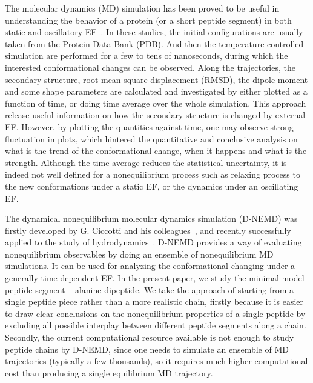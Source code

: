 \documentclass[a4paper,preprint,unsortedaddress,onecolumn]{revtex4-1}
\begin{document}
The molecular dynamics (MD) simulation has been proved to be useful in
understanding the behavior of a protein (or a short peptide segment)
in both static and oscillatory EF~\cite{budi2005electric, budi2007effect, budi2008comparative,
  toschi2008effects, astrakas2011electric, astrakas2012structural,
  damm2012can, starzyk2013proteins, english2009nonequilibrium,
  solomentsev2012effects}. In these studies, the initial
configurations are usually taken from the Protein Data Bank (PDB).
And then the temperature controlled simulation are performed for 
a few to tens of nanoseconds, during which the interested
conformational changes can be observed. Along the trajectories, the
secondary structure, root mean square displacement (RMSD), the dipole
moment and some shape parameters are calculated and investigated by
either plotted as a function of time, or doing time average over the
whole simulation. This approach release useful information on how the
secondary structure is changed by external  EF.  However,
by plotting the quantities against time, one may observe strong
fluctuation in plots, which hintered the quantitative and conclusive
analysis on what is the trend of the conformational change, when
it happens and what is the strength.
Although the time average reduces the statistical uncertainty,
it is indeed not well defined for a nonequilibrium process
such as relaxing process to the new conformations under a static
EF, or the dynamics under an oscillating EF.

The dynamical nonequilibrium molecular dynamics simulation (D-NEMD)
was firstly developed by G. Ciccotti and his
colleagues~\cite{ciccotti1975direct, ciccotti1979thought}, and
recently successfully applied to the study of
hydrodynamics~\cite{orlandini2011hydrodynamics,
  orlandini2011hydrodynamics-01}. D-NEMD provides a way of evaluating
nonequilibrium observables by doing an ensemble of nonequilibrium MD
simulations.  It can be used for analyzing the
conformational changing under a generally time-dependent EF.
In the present paper, we study the minimal model peptide
segment -- alanine dipeptide. We take the approach of starting from a
single peptide piece rather than a more realistic chain, firstly because it
is easier to draw clear conclusions on the nonequilibrium properties
of a single peptide by excluding all possible interplay between
different peptide segments along a chain.
Secondly, the current computational resource available is not enough
to study peptide chains by D-NEMD, since one needs to simulate an
ensemble of MD trajectories (typically a few thousands), so it
requires much higher computational cost than producing a single
equilibrium MD trajectory.
\end{document}
